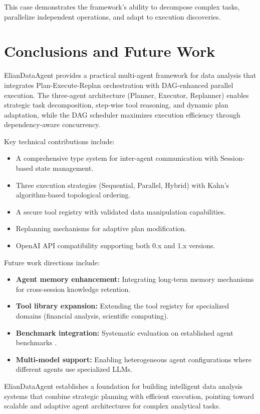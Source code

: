 \documentclass{article}
\theoremstyle{definition}
\begin{document}
This case demonstrates the framework's ability to decompose complex tasks, parallelize independent operations, and adapt to execution discoveries.


\section{Conclusions and Future Work}

ElianDataAgent provides a practical multi-agent framework for data analysis that integrates Plan-Execute-Replan orchestration with DAG-enhanced parallel execution. The three-agent architecture (Planner, Executor, Replanner) enables strategic task decomposition, step-wise tool reasoning, and dynamic plan adaptation, while the DAG scheduler maximizes execution efficiency through dependency-aware concurrency.

Key technical contributions include:
\begin{itemize}[leftmargin=*, align=left]
    \item A comprehensive type system for inter-agent communication with Session-based state management.
    \item Three execution strategies (Sequential, Parallel, Hybrid) with Kahn's algorithm-based topological ordering.
    \item A secure tool registry with validated data manipulation capabilities.
    \item Replanning mechanisms for adaptive plan modification.
    \item OpenAI API compatibility supporting both 0.x and 1.x versions.
\end{itemize}

Future work directions include:
\begin{itemize}[leftmargin=*, align=left]
    \item \textbf{Agent memory enhancement:} Integrating long-term memory mechanisms \cite{zhong2024memorybank,packer2023memgpt} for cross-session knowledge retention.
    \item \textbf{Tool library expansion:} Extending the tool registry for specialized domains (financial analysis, scientific computing).
    \item \textbf{Benchmark integration:} Systematic evaluation on established agent benchmarks \cite{liu2023agentbench,zheng2025lifelongagentbench}.
    \item \textbf{Multi-model support:} Enabling heterogeneous agent configurations where different agents use specialized LLMs.
\end{itemize}

ElianDataAgent establishes a foundation for building intelligent data analysis systems that combine strategic planning with efficient execution, pointing toward scalable and adaptive agent architectures for complex analytical tasks.




\end{document}
